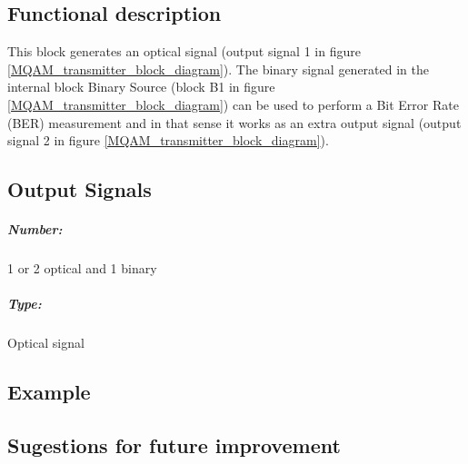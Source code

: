 \documentclass[a4paper]{article}
\begin{document}
\subsection*{Functional description}

This block generates an optical signal (output signal 1 in figure \ref{MQAM_transmitter_block_diagram}). The binary signal generated in the internal block Binary Source (block B1 in figure \ref{MQAM_transmitter_block_diagram}) can be used to perform a Bit Error Rate (BER) measurement and in that sense it works as an extra output signal (output signal 2 in figure \ref{MQAM_transmitter_block_diagram}). 

\subsection*{Output Signals}

\subparagraph*{Number:} 1 or 2 optical and 1 binary

\subparagraph*{Type:} Optical signal

\subsection*{Example} 

\subsection*{Sugestions for future improvement}
\end{document}
